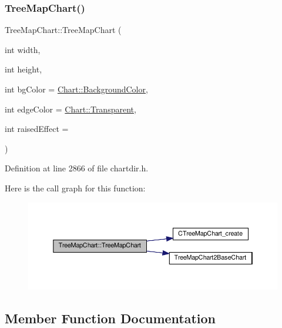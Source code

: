 \subsubsection{\texorpdfstring{Tree\+Map\+Chart()}{TreeMapChart()}}
{\footnotesize\ttfamily Tree\+Map\+Chart\+::\+Tree\+Map\+Chart (\begin{DoxyParamCaption}\item[{int}]{width,  }\item[{int}]{height,  }\item[{int}]{bg\+Color = {\ttfamily \hyperlink{namespace_chart_abee0d882fdc9ad0b001245ad9fc64011a134193bde693b9d152d0c6dc59fa7d7f}{Chart\+::\+Background\+Color}},  }\item[{int}]{edge\+Color = {\ttfamily \hyperlink{namespace_chart_abee0d882fdc9ad0b001245ad9fc64011afc6811800a9e2582dac0157b6279f836}{Chart\+::\+Transparent}},  }\item[{int}]{raised\+Effect = {} }\end{DoxyParamCaption})\hspace{0.3cm}{\ttfamily [inline]}}



Definition at line 2866 of file chartdir.\+h.

Here is the call graph for this function\+:
\nopagebreak
\begin{figure}[H]
\begin{center}
\leavevmode
\includegraphics[width=350pt]{class_tree_map_chart_af8b6f364bd9d8e1678e696bb855beeb9_cgraph}
\end{center}
\end{figure}


\subsection{Member Function Documentation}
\mbox{\label{class_tree_map_chart_a6a8f50c363473cd412a4b8b8e2b40cef}} 
